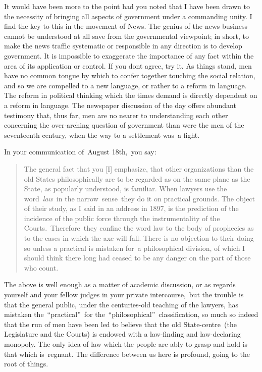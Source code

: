 \documentclass[openany,nobib]{tufte-book}
\begin{document}
It would have been more to the point had you noted that I have been
drawn to the necessity of bringing all aspects of government under a
commanding unity. I find the key to this in the movement of News. The
genius of the news business cannot be understood at all save from the
governmental viewpoint; in short, to make the news traffic systematic or
responsible in any direction is to develop government. It is impossible
to exaggerate the importance of any fact within the area of its
application or control. If you don\textquotesingle t agree, try it. As
things stand, men have no common tongue by which to confer together
touching the social relation, and so we are compelled to a new language,
or rather to a reform in language. The reform in political thinking
which the times demand is directly dependent on a reform in language.
The newspaper discussion of the day offers abundant testimony that, thus
far, men are no nearer to understanding each other concerning the
over-arching question of government than were the men of the seventeenth
century, when the way to a settlement was~a fight.~

In your communication of~August 18th,~you say:~

\begin{quote}
The general fact that you {[}I{]} emphasize, that other organizations
than the old States philosophically are to be regarded as on the same
plane as the State, as popularly understood, is familiar. When lawyers
use the word~\emph{law}~in the narrow~sense~they do it on practical
grounds. The object of their study, as I said in an address in 1897, is
the prediction of the incidence of the public force through the
instrumentality of the Courts.~Therefore~they confine the word law to
the body of prophecies as to the cases in which the axe will fall. There
is no objection to their doing so unless a practical is mistaken for~a
philosophical division, of which I should think there long had ceased to
be any danger on the part of those who count.
\end{quote}

The above is well enough as a matter of academic discussion, or as
regards yourself and your fellow judges in your private intercourse,~but
the trouble is that the general public, under the centuries-old teaching
of the lawyers, has mistaken the~``practical''~for
the~``philosophical''~classification, so much so indeed that the run of
men have been led to believe that the old State-centre~(the Legislature
and the Courts) is endowed with a law-finding and law-declaring
monopoly. The only idea of law which the people are ably to grasp and
hold is that which is~regnant. The difference between us here is
profound, going to the root of things.~
\end{document}
